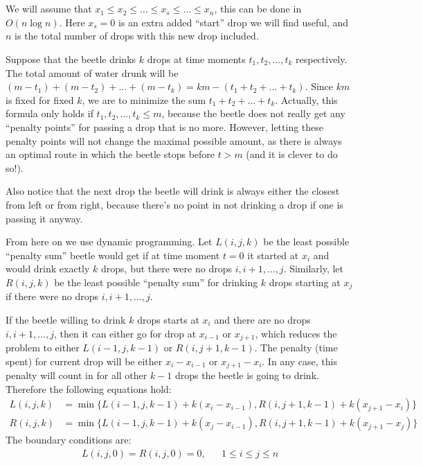 \documentclass{boistyle}
\begin{document}
\section*{\Spoiler}

We will assume that $x_1 \le x_2 \le \ldots \le x_s \le \ldots \le x_n$, this can be done in $O(n \log n)$.
Here $x_s = 0$ is an extra added ``start'' drop we will find useful,
and $n$ is the total number of drops with this new drop included.

Suppose that the beetle drinks $k$ drops at time moments $t_1, t_2, \ldots, t_k$ respectively.
The total amount of water drunk will be $(m-t_1)+(m-t_2)+\ldots+(m-t_k)=km-(t_1+t_2+\ldots+t_k)$.
Since $km$ is fixed for fixed $k$, we are to minimize the sum $t_1+t_2+\ldots+t_k$.
Actually, this formula only holds if $t_1, t_2, \ldots, t_k \le m$, because the beetle does not really get any
``penalty points'' for passing a drop that is no more.
However, letting these penalty points will not change the maximal possible amount,
as there is always an optimal route in which the beetle stops before $t > m$ (and it is clever to do so!).

Also notice that the next drop the beetle will drink is always either the closest from left or from right,
because there's no point in not drinking a drop if one is passing it anyway.

From here on we use dynamic programming.
Let $L(i, j, k)$ be the least possible ``penalty sum'' beetle would get if at time moment $t=0$ it started at $x_i$ and would 
drink exactly $k$ drops, but there were no drops $i, i+1, \ldots, j$.
Similarly, let $R(i, j, k)$ be the least possible ``penalty sum'' for drinking $k$ drops starting at $x_j$ if there were no drops $i, i+1, \ldots, j$.

If the beetle willing to drink $k$ drops starts at $x_i$ and there are no drops $i, i+1, \ldots, j$,
then it can either go for drop at $x_{i-1}$ or $x_{j+1}$,
which reduces the problem to either $L(i-1, j, k-1)$ or $R(i, j+1, k-1)$.
The penalty (time spent) for current drop will be either $x_i - x_{i-1}$ or $x_{j+1} - x_i$.
In any case, this penalty will count in for all other $k - 1$ drops the beetle is going to drink.
Therefore the following equations hold:
\begin{align*}
L(i, j, k) &= \min \{ L(i-1, j, k-1) + k(x_i - x_{i-1}), R(i, j+1, k-1) + k(x_{j+1} - x_i) \} \\
R(i, j, k) &= \min \{ L(i-1, j, k-1) + k(x_j - x_{i-1}), R(i, j+1, k-1) + k(x_{j+1} - x_j) \}
\end{align*}
The boundary conditions are:
\begin{align*}
L(i, j, 0) = R(i, j, 0) = 0, && 1 \le i \le j \le n
\end{align*}
\end{document}
